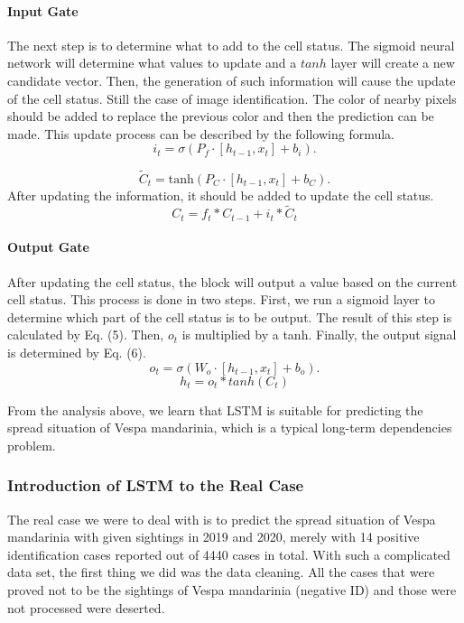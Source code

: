 \documentclass{mcmthesis}
\begin{document}
\paragraph{Input Gate}
The next step is to determine what to add to the cell status. The sigmoid neural network will determine what values to update and a $tanh$ layer will create a new candidate vector. Then, the generation of such information will cause the update of the cell status. Still the case of image identification. The color of nearby pixels should be added to replace the previous color and then the prediction can be made. This update process can be described by the following formula.
\begin{equation}
	i_{t}=\sigma(P_{f}\cdot [h_{t-1}, x_{t}]+b_{i}).
\end{equation}

\begin{equation}
	\tilde C_{t}=\text{tanh}(P_{C}\cdot [h_{t-1}, x_{t}]+b_{C}).
\end{equation}
After updating the information, it should be added to update the cell status.
\begin{equation}
	C_{t}=f_{t}*C_{t-1}+i_{t}*\tilde C_{t}
\end{equation}
\paragraph{Output Gate}
After updating the cell status, the block will output a value based on the current cell status. This process is done in two steps. First, we run a sigmoid layer to determine which part of the cell status is to be output. The result of this step is calculated by Eq. (5). Then, $o_{t}$ is multiplied by a tanh. Finally, the output signal is determined by Eq. (6).
 \begin{equation}
	o_{t}=\sigma(W_{o}\cdot [h_{t-1}, x_{t}]+b_{o}).
\end{equation}
\begin{equation}
	h_{t}=o_{t}*tanh(C_{t})
\end{equation}

From the analysis above, we learn that LSTM is suitable for predicting the spread situation of Vespa mandarinia, which is a typical long-term dependencies problem.

\subsubsection{Introduction of LSTM to the Real Case} 
The real case we were to deal with is to predict the spread situation of Vespa mandarinia with given sightings in 2019 and 2020, merely with 14 positive identification cases reported out of 4440 cases in total. With such a complicated data set, the first thing we did was the data cleaning. All the cases that were proved not to be the sightings of Vespa mandarinia (negative ID) and those were not processed were deserted. 
\end{document}
